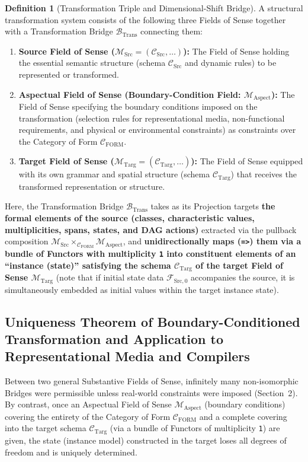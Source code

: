 \documentclass[11pt,a4paper]{article}
\theoremstyle{definition}
\newtheorem{definition}{Definition}[section]
\theoremstyle{plain}
\theoremstyle{remark}
\newcommand{\CFORM}{\mathcal{C}_{\mathrm{FORM}}}
\newcommand{\CSrc}{\mathcal{C}_{\mathrm{Src}}}
\newcommand{\CTarg}{\mathcal{C}_{\mathrm{Targ}}}
\newcommand{\MSrc}{\mathcal{M}_{\mathrm{Src}}}
\newcommand{\MTarg}{\mathcal{M}_{\mathrm{Targ}}}
\newcommand{\MAspect}{\mathcal{M}_{\mathrm{Aspect}}}
\newcommand{\BTrans}{\mathcal{B}_{\mathrm{Trans}}}
\begin{document}
\begin{definition}[Transformation Triple and Dimensional-Shift Bridge]\label{def:transformation-triple}
A structural transformation system consists of the following three Fields of Sense together with a Transformation Bridge $\BTrans$ connecting them:

\begin{enumerate}
    \item \textbf{Source Field of Sense ($\MSrc = (\CSrc, \dots)$):} The Field of Sense holding the essential semantic structure (schema $\CSrc$ and dynamic rules) to be represented or transformed.
    \item \textbf{Aspectual Field of Sense (Boundary-Condition Field: $\MAspect$):} The Field of Sense specifying the boundary conditions imposed on the transformation (selection rules for representational media, non-functional requirements, and physical or environmental constraints) as constraints over the Category of Form $\CFORM$.
    \item \textbf{Target Field of Sense ($\MTarg = (\CTarg, \dots)$):} The Field of Sense equipped with its own grammar and spatial structure (schema $\CTarg$) that receives the transformed representation or structure.
\end{enumerate}

Here, the Transformation Bridge $\BTrans$ takes as its Projection targets \textbf{the formal elements of the source (classes, characteristic values, multiplicities, spans, states, and DAG actions)} extracted via the pullback composition $\MSrc \times_{\CFORM} \MAspect$, and \textbf{unidirectionally maps (\texttt{=>}) them via a bundle of Functors with multiplicity \texttt{1} into constituent elements of an ``instance (state)'' satisfying the schema $\CTarg$ of the target Field of Sense $\MTarg$} (note that if initial state data $\mathcal{F}_{\mathrm{Src}, 0}$ accompanies the source, it is simultaneously embedded as initial values within the target instance state).
\end{definition}

\subsection{Uniqueness Theorem of Boundary-Conditioned Transformation and Application to Representational Media and Compilers}
Between two general Substantive Fields of Sense, infinitely many non-isomorphic Bridges were permissible unless real-world constraints were imposed (Section~2). By contrast, once an Aspectual Field of Sense $\MAspect$ (boundary conditions) covering the entirety of the Category of Form $\CFORM$ and a complete covering into the target schema $\CTarg$ (via a bundle of Functors of multiplicity \texttt{1}) are given, the state (instance model) constructed in the target loses all degrees of freedom and is uniquely determined.
\end{document}
